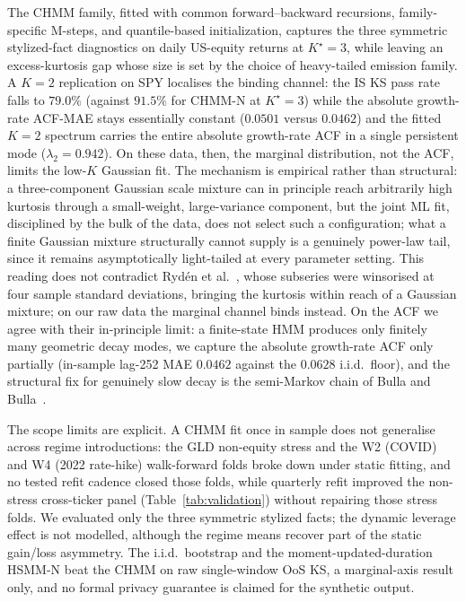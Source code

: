 The CHMM family, fitted with common forward--backward recursions, family-specific M-steps, and quantile-based initialization, captures the three symmetric stylized-fact diagnostics on daily US-equity returns at $K^\star = 3$, while leaving an excess-kurtosis gap whose size is set by the choice of heavy-tailed emission family. A $K = 2$ replication on SPY localises the binding channel: the IS KS pass rate falls to $79.0\%$ (against $91.5\%$ for CHMM-N at $K^\star = 3$) while the absolute growth-rate ACF-MAE stays essentially constant ($0.0501$ versus $0.0462$) and the fitted $K = 2$ spectrum carries the entire absolute growth-rate ACF in a single persistent mode ($\lambda_2 = 0.942$). On these data, then, the marginal distribution, not the ACF, limits the low-$K$ Gaussian fit. The mechanism is empirical rather than structural: a three-component Gaussian scale mixture can in principle reach arbitrarily high kurtosis through a small-weight, large-variance component, but the joint ML fit, disciplined by the bulk of the data, does not select such a configuration; what a finite Gaussian mixture structurally cannot supply is a genuinely power-law tail, since it remains asymptotically light-tailed at every parameter setting. This reading does not contradict Ryd\'{e}n et al.~\cite{ryden1998stylized}, whose subseries were winsorised at four sample standard deviations, bringing the kurtosis within reach of a Gaussian mixture; on our raw data the marginal channel binds instead. On the ACF we agree with their in-principle limit: a finite-state HMM produces only finitely many geometric decay modes, we capture the absolute growth-rate ACF only partially (in-sample lag-252 MAE $0.0462$ against the $0.0628$ i.i.d.\ floor), and the structural fix for genuinely slow decay is the semi-Markov chain of Bulla and Bulla~\cite{bulla2006stylized}.

The scope limits are explicit. A CHMM fit once in sample does not generalise across regime introductions: the GLD non-equity stress and the W2 (COVID) and W4 (2022 rate-hike) walk-forward folds broke down under static fitting, and no tested refit cadence closed those folds, while quarterly refit improved the non-stress cross-ticker panel (Table~\ref{tab:validation}) without repairing those stress folds. We evaluated only the three symmetric stylized facts; the dynamic leverage effect is not modelled, although the regime means recover part of the static gain/loss asymmetry. The i.i.d.\ bootstrap and the moment-updated-duration HSMM-N beat the CHMM on raw single-window OoS KS, a marginal-axis result only, and no formal privacy guarantee is claimed for the synthetic output.


